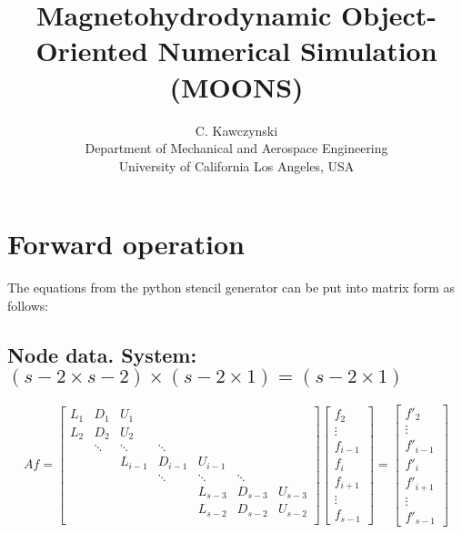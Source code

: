 \documentclass[11pt]{article}
\begin{document}
\doublespacing
\title{Magnetohydrodynamic Object-Oriented Numerical Simulation (MOONS)}
\author{C. Kawczynski \\
Department of Mechanical and Aerospace Engineering \\
University of California Los Angeles, USA\\
}
\section{Forward operation}
The equations from the python stencil generator can be put into matrix form as follows:

\subsection{Node data. System:
\texorpdfstring{$ (s-2 \times s-2) \times (s-2 \times 1) = (s-2 \times 1)$}{}}
\[ Af = \left[
\begin{array}{ccccccccc}
L_{1} & D_{1}    & U_{1}     &           &           &           &         \\
L_{2} & D_{2}    & U_{2}     &           &           &           &         \\
      & \ddots   & \ddots    & \ddots    &           &           &         \\
      &          & L_{i-1}   & D_{i-1}   & U_{i-1}   &           &         \\
      &          &           & \ddots    & \ddots    & \ddots    &         \\
      &          &           &           & L_{s-3}   & D_{s-3}   & U_{s-3} \\
      &          &           &           & L_{s-2}   & D_{s-2}   & U_{s-2} \\
\end{array} \right] 
\left[ \begin{array}{c}
f_{2} \\ \vdots \\ f_{i-1} \\ f_{i} \\ f_{i+1} \\ \vdots \\ f_{s-1}
\end{array} \right]
=
\left[ \begin{array}{c}
f'_{2} \\ \vdots \\ f'_{i-1} \\ f'_{i} \\ f'_{i+1} \\ \vdots \\ f'_{s-1}
\end{array} \right]
\]
\end{document}

